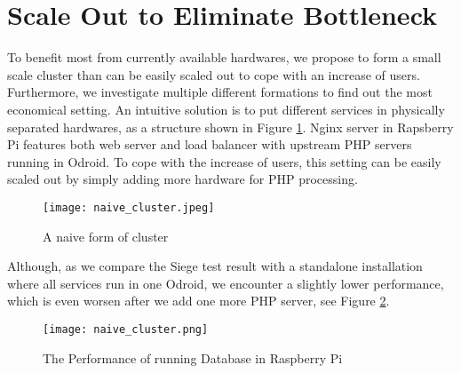 \section{Scale Out to Eliminate Bottleneck}
To benefit most from currently available hardwares, we propose to form a small scale cluster than can be easily scaled out to cope with an increase of users. Furthermore, we investigate multiple different formations to find out the most economical setting. An intuitive solution is to put different services in physically separated hardwares, as a structure shown in Figure \ref{naive_cluster_form}. Nginx server in Rapsberry Pi features both web server and load balancer with upstream PHP servers running in Odroid. To cope with the increase of users, this setting can be easily scaled out by simply adding more hardware for PHP processing.
\begin{figure}[htbp]
\centering
\texttt{[image: naive\_cluster.jpeg]}
\caption{A naive form of cluster}
\label{naive_cluster_form}
\end{figure}
Although, as we compare the Siege test result with a standalone installation where all services run in one Odroid, we encounter a slightly lower performance, which is even worsen after we add one more PHP server, see Figure \ref{naive_cluster}.

\begin{figure}[htbp]
\centering
\texttt{[image: naive\_cluster.png]}
\caption{The Performance of running Database in Raspberry Pi}
\label{naive_cluster}
\end{figure}

